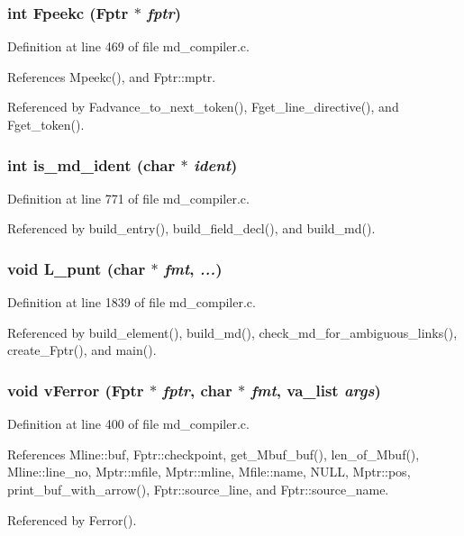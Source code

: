 \subsubsection{\setlength{\rightskip}{0pt plus 5cm}int Fpeekc (\bf{Fptr} $\ast$ {\em fptr})}\label{md__compiler_8h_c06c4367d84d0b622fea24b7c6702f47}




Definition at line 469 of file md\_\-compiler.c.

References Mpeekc(), and Fptr::mptr.

Referenced by Fadvance\_\-to\_\-next\_\-token(), Fget\_\-line\_\-directive(), and Fget\_\-token().
\subsubsection{\setlength{\rightskip}{0pt plus 5cm}int is\_\-md\_\-ident (char $\ast$ {\em ident})}\label{md__compiler_8h_39ca8b26d2e0c556d2146f76b6c1f51a}




Definition at line 771 of file md\_\-compiler.c.

Referenced by build\_\-entry(), build\_\-field\_\-decl(), and build\_\-md().
\subsubsection{\setlength{\rightskip}{0pt plus 5cm}void L\_\-punt (char $\ast$ {\em fmt},  {\em ...})}\label{md__compiler_8h_c8ccfa451c1bd1740a1b720ba5b4c3a9}




Definition at line 1839 of file md\_\-compiler.c.

Referenced by build\_\-element(), build\_\-md(), check\_\-md\_\-for\_\-ambiguous\_\-links(), create\_\-Fptr(), and main().
\subsubsection{\setlength{\rightskip}{0pt plus 5cm}void v\-Ferror (\bf{Fptr} $\ast$ {\em fptr}, char $\ast$ {\em fmt}, va\_\-list {\em args})}\label{md__compiler_8h_d52c3f1409f7b9a5f521e34fa8c866a3}




Definition at line 400 of file md\_\-compiler.c.

References Mline::buf, Fptr::checkpoint, get\_\-Mbuf\_\-buf(), len\_\-of\_\-Mbuf(), Mline::line\_\-no, Mptr::mfile, Mptr::mline, Mfile::name, NULL, Mptr::pos, print\_\-buf\_\-with\_\-arrow(), Fptr::source\_\-line, and Fptr::source\_\-name.

Referenced by Ferror().